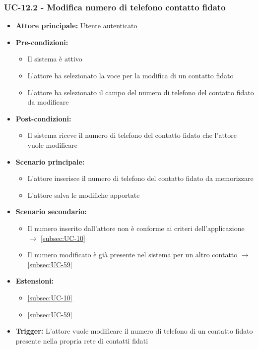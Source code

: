 \documentclass[a4paper,12pt]{article}
\begin{document}
\subsubsection{UC-12.2 - Modifica numero di telefono contatto fidato} \label{subsec:UC-12.2}
\begin{itemize}
    \item \textbf{Attore principale:} Utente autenticato
    \item \textbf{Pre-condizioni:}
    \begin{itemize}
        \item Il sistema è attivo
        \item L'attore ha selezionato la voce per la modifica di un contatto fidato
        \item L'attore ha selezionato il campo del numero di telefono del contatto fidato da modificare
    \end{itemize}
    \item \textbf{Post-condizioni:} 
    \begin{itemize}
        \item Il sistema riceve il numero di telefono del contatto fidato che l'attore vuole modificare
    \end{itemize}
    \item \textbf{Scenario principale:} 
    \begin{itemize}
        \item L'attore inserisce il numero di telefono del contatto fidato da memorizzare
        \item L'attore salva le modifiche apportate
    \end{itemize}
    \item \textbf{Scenario secondario:}
    \begin{itemize}
        \item Il numero inserito dall'attore non è conforme ai criteri dell'applicazione $\rightarrow$ \ref{subsec:UC-10}
        \item Il numero modificato è già presente nel sistema per un altro contatto $\rightarrow$ \ref{subsec:UC-59}
    \end{itemize}
    \item \textbf{Estensioni:}
    \begin{itemize}
        \item \ref{subsec:UC-10}
        \item \ref{subsec:UC-59}
    \end{itemize}
    \item \textbf{Trigger:} L'attore vuole modificare il numero di telefono di un contatto fidato presente nella propria rete di contatti fidati
\end{itemize}
\end{document}
